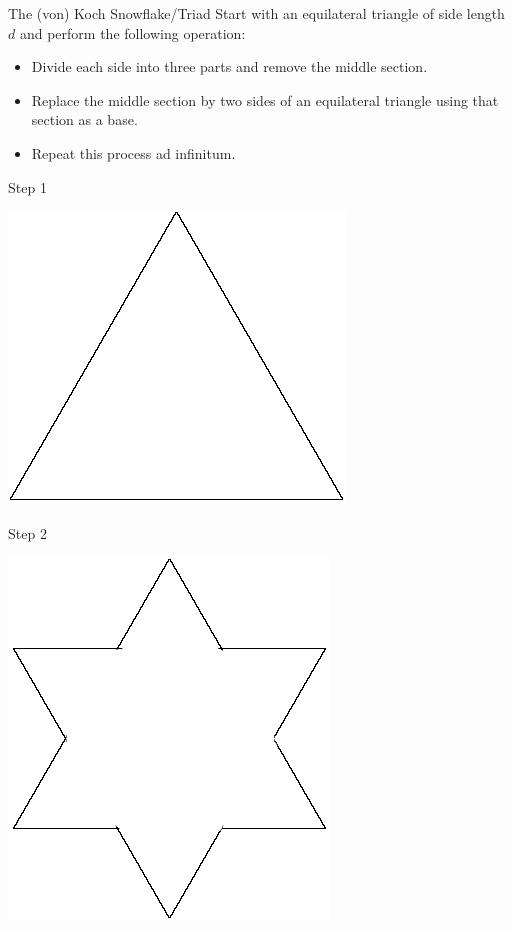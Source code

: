 \documentclass[10pt]{beamer}
\begin{document}
\begin{frame}{The (von) Koch Snowflake/Triad}
  Start with an equilateral triangle of side length $d$ and perform the following operation:
  \begin{itemize}
  \item
    Divide each side into three parts and remove the middle section.
  \item
    Replace the middle section by two sides of an equilateral triangle using that section as a base.
  \item
    Repeat this process ad infinitum.
  \end{itemize}
\end{frame}

\begin{frame}{Step 1}
  \begin{center}
    \includegraphics[scale=0.5]{./koch/triangle.png}
  \end{center}
\end{frame}

\begin{frame}{Step 2}
  \begin{center}
    \includegraphics[scale=0.5]{./koch/step2.png}
  \end{center}
\end{frame}
\end{document}
